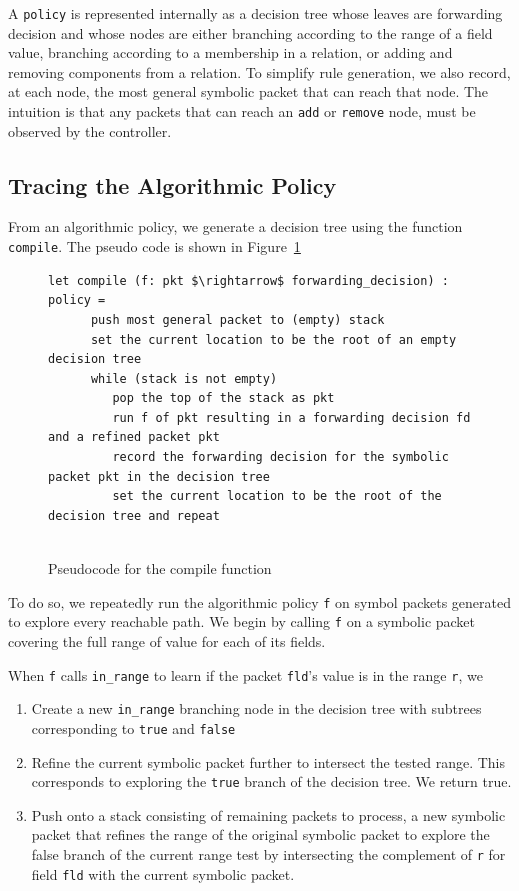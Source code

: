 \documentclass[preprint]{sigplanconf}
\begin{document}
A \lstinline|policy| is represented internally as a decision tree whose leaves are forwarding decision and whose nodes are either branching according to the range of a field value, branching according to a membership in a relation, or adding and removing components from a relation. To simplify rule generation, we also record, at each node, the most general symbolic packet that can reach that node. The intuition is that any packets that can reach an \lstinline|add| or \lstinline|remove| node, must be observed by the controller.


\subsection*{Tracing the Algorithmic Policy}
From an algorithmic policy, we generate a decision tree using the function \lstinline|compile|. The pseudo code is shown in Figure~\ref{fig:compile-pseudo}

\begin{figure}[ht]
\begin{lstlisting}[mathescape]
let compile (f: pkt $\rightarrow$ forwarding_decision) : policy =
      push most general packet to (empty) stack
      set the current location to be the root of an empty decision tree
      while (stack is not empty)
         pop the top of the stack as pkt
         run f of pkt resulting in a forwarding decision fd and a refined packet pkt
         record the forwarding decision for the symbolic packet pkt in the decision tree
         set the current location to be the root of the decision tree and repeat
  
\end{lstlisting}
\caption{Pseudocode for the compile function}
\label{fig:compile-pseudo}
\end{figure}

To do so, we repeatedly run the algorithmic policy \lstinline|f| on symbol packets generated to explore every reachable path.
We begin by calling \lstinline|f| on a symbolic packet covering the full range of value for each of its fields.

When \lstinline|f| calls \lstinline|in_range| to learn if the packet \lstinline|fld|'s value is in the range \lstinline|r|, we
\begin{enumerate}
\item  Create a new \lstinline|in_range| branching node in the decision tree with subtrees corresponding to \lstinline|true| and \lstinline|false|
\item Refine the current symbolic packet further to intersect the tested range. This corresponds to exploring the \lstinline|true| branch of the decision tree. We return true. 
\item Push onto a stack consisting of remaining packets to process, a new symbolic packet that refines the range of the original symbolic packet to explore the false branch of the current range test by intersecting the complement of \lstinline|r| for field \lstinline|fld| with the current symbolic packet.
\end{enumerate}
\end{document}
